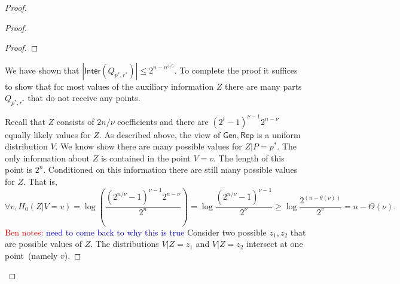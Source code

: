 \documentclass[11pt]{article}
\newcommand{\class}[1]{{\ensuremath{\mathsf{#1}}}}
\newcommand{\gen}{\ensuremath{\class{Gen}}\xspace}
\newcommand{\rep}{\ensuremath{\class{Rep}}\xspace}
\newcommand{\inter}{\ensuremath{\class{Inter}}\xspace}
\newcommand{\authnote}[2]{{\textcolor{red}{\textsf{#1 notes: }\textcolor{blue}{ #2}}\marginpar{\textcolor{red}{\textbf{!!!!!}}}}}
\newcommand{\authnote}[2]{}
\newcommand{\bnote}[1]{{\authnote{Ben}{#1}}}
\begin{document}
\begin{proof}
\begin{proof}
\begin{proof}
%
\end{proof}

We have shown that $|\inter(Q_{p^*, r^*})| \le 2^{n-n^{3/5}}$.  %
To complete the proof it suffices to show that for most values of the auxiliary information $Z$ there are many parts $Q_{p^*, r^*}$ that do not receive any points.  

Recall that $Z$ consists of $2n/\nu$ coefficients and there are $(2^t-1)^{\nu-1} 2^{n-\nu}$ equally likely values for $Z$.
 As described above, the view of $\gen, \rep$ is a uniform distribution $V$.  We know show there are many possible values for $Z |P=p^*$.  The only information about $Z$ is contained in the point  $V=v$.  The length of this point is $2^n$.  Conditioned on this information there are still many possible values for $Z$.  That is, 
 \[
 \forall v, H_0(Z | V=v) =\log \left(\frac{(2^{n/\nu}-1)^{\nu-1} 2^{n-\nu}}{2^n} \right) = \log \frac{(2^{n/\nu}-1)^{\nu-1}}{2^{\nu}} \ge \log \frac{2^{(n-\theta(\nu))}}{2^v} = n -\Theta(\nu).
 \]
 \bnote{need to come back to why this is true}
Consider two possible $z_1, z_2$ that are possible values of $Z$.  The distributions $V| Z=z_1$ and $V | Z=z_2$ intersect at one point~(namely $v$).  


\end{proof}
\end{proof}
\end{document}
